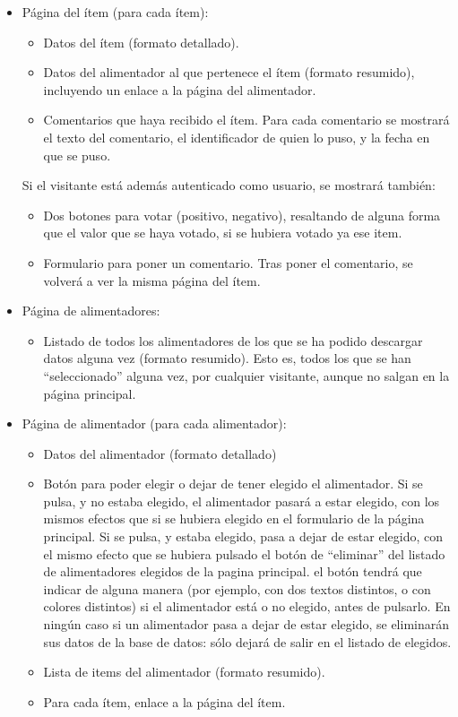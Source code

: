 \begin{itemize}
  \item Página del ítem (para cada ítem):

    \begin{itemize}
    \item Datos del ítem (formato detallado).
    \item Datos del alimentador al que pertenece el ítem (formato resumido), incluyendo un enlace a la página del alimentador.
    \item Comentarios que haya recibido el ítem. Para cada comentario se mostrará el texto del comentario, el identificador de quien lo puso, y la fecha en que se puso.
    \end{itemize}

    Si el visitante está además autenticado como usuario, se mostrará también:

    \begin{itemize}
    \item Dos botones para votar (positivo, negativo), resaltando de alguna forma que el valor que se haya votado, si se hubiera votado ya ese item.
    \item Formulario para poner un comentario. Tras poner el comentario, se volverá a ver la misma página del ítem.
    \end{itemize}

  \item Página de alimentadores:

    \begin{itemize}
    \item Listado de todos los alimentadores de los que se ha podido descargar datos alguna vez (formato resumido). Esto es, todos los que se han ``seleccionado'' alguna vez, por cualquier visitante, aunque no salgan en la página principal.
    \end{itemize}
    
  \item Página de alimentador (para cada alimentador):

    \begin{itemize}
    \item Datos del alimentador (formato detallado)
    \item Botón para poder elegir o dejar de tener elegido el alimentador. Si se pulsa, y no estaba elegido, el alimentador pasará a estar elegido, con los mismos efectos que si se hubiera elegido en el formulario de la página principal. Si se pulsa, y estaba elegido, pasa a dejar de estar elegido, con el mismo efecto que se hubiera pulsado el botón de ``eliminar'' del listado de alimentadores elegidos de la pagina principal. el botón tendrá que indicar de alguna manera (por ejemplo, con dos textos distintos, o con colores distintos) si el alimentador está o no elegido, antes de pulsarlo. En ningún caso si un alimentador pasa a dejar de estar elegido, se eliminarán sus datos de la base de datos: sólo dejará de salir en el listado de elegidos.
    \item Lista de items del alimentador (formato resumido).
    \item Para cada ítem, enlace a la página del ítem.
    \end{itemize}


\end{itemize}
